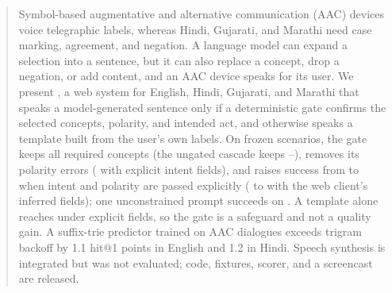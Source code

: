 \begin{abstract}
Symbol-based augmentative and alternative communication (AAC) devices voice telegraphic labels, whereas Hindi, Gujarati, and Marathi need case marking, agreement, and negation.
A language model can expand a selection into a sentence, but it can also replace a concept, drop a negation, or add content, and an AAC device speaks for its user.
We present \sys{}, a web system for English, Hindi, Gujarati, and Marathi that speaks a model-generated sentence only if a deterministic gate confirms the selected concepts, polarity, and intended act, and otherwise speaks a template built from the user's own labels.
On \NPrimAll{} frozen scenarios, the gate keeps all \NConc{} required concepts (the ungated cascade keeps \XPreUKeptPct{}--\XPreSKeptPct{}), removes its polarity errors (\XPreSPol{} with explicit intent fields), and raises success from \XPreSSuccPct{} to \XDepSSuccPct{} when intent and polarity are passed explicitly (\XPreUSuccPct{} to \XDepUSuccPct{} with the web client's inferred fields); one unconstrained prompt succeeds on \XNaiveSuccPct{}.
A template alone reaches \XTmplSSuccPct{} under explicit fields, so the gate is a safeguard and not a quality gain.
A suffix-trie predictor trained on AAC dialogues exceeds trigram backoff by 1.1 hit@1 points in English and 1.2 in Hindi.
Speech synthesis is integrated but was not evaluated; code, fixtures, scorer, and a screencast are released.
\end{abstract}
